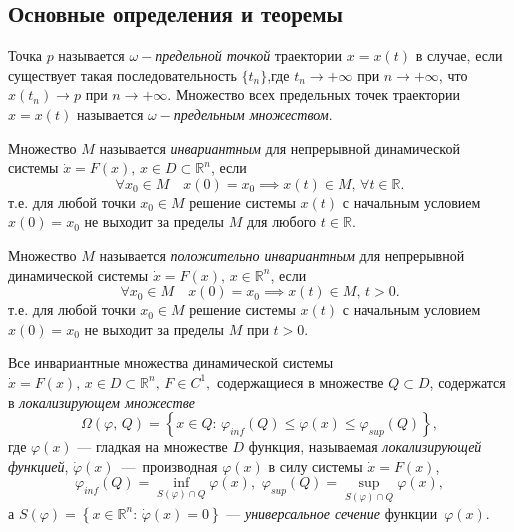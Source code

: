 \documentclass[14pt,a4paper]{extarticle}
\begin{document}
	\subsection{Основные определения и теоремы}
	
	\begin{definition}
		Точка $p$ называется \textit{$\omega-$предельной точкой} траектории \linebreak$x=x(t)$ в случае, если существует такая последовательность $\{t_n\}$,\linebreak где $t_n\rightarrow+\infty$ при $n\rightarrow+\infty$, что $x(t_n)\rightarrow p$ при $n\rightarrow+\infty$. Множество всех предельных точек траектории $x=x(t)$ называется \textit{$\omega-$предельным множеством}.
	\end{definition}
	
	\begin{definition}
		Множество $M$ называется \textit{инвариантным} для непрерывной динамической системы $\dot{x} = F(x),\, x\in D\subset\mathbb{R}^n$, если 
		\[\forall{}x_0\in{}M\quad x(0)=x_0\implies{}x(t)\in{}M,\,\forall{}t\in\mathbb{R}.\]
		т.е. для любой точки $x_0\in M$ решение системы $x(t)$ с начальным условием $x(0)=x_0$ не выходит за пределы $M$ для любого $t\in\mathbb{R}$.
	\end{definition}
	
	\begin{definition}
		Множество $M$ называется \textit{положительно инвариантным} для непрерывной динамической системы $\dot{x} = F(x),\, x\in\mathbb{R}^n$, если 
		\[\forall{}x_0\in{}M\quad x(0)=x_0\implies{}x(t)\in{}M,\, t>0.\]
		т.е. для любой точки $x_0\in M$ решение системы $x(t)$ с начальным условием $x(0)=x_0$ не выходит за пределы $M$ при $t>0$.
	\end{definition}
	
	\begin{theorem}\cite{invar_comp}
		Все инвариантные множества динамической системы \linebreak$\dot{x} = F(x),\, x\in D\subset\mathbb{R}^n,\, F\in C^1,$ содержащиеся в множестве $Q\subset D$, содержатся в \textit{локализирующем множестве}
		\[\Omega(\varphi,\, Q) = \left\{x\in Q:\, \varphi_{inf}(Q)\le \varphi(x) \le \varphi_{sup}(Q)\right\},\]
		где $\varphi(x)$ --- гладкая на множестве $D$ функция, называемая \textit{локализирующей функцией}, $\dot{\varphi}(x)$~---~производная $\varphi(x)$ в силу системы $\dot{x}=F(x)$,
		\[\varphi_{inf}(Q) = \inf\limits_{S(\varphi)\cap Q}\varphi(x),\,\,\varphi_{sup}(Q) = \sup\limits_{S(\varphi)\cap Q}\varphi(x),\]
		а $S(\varphi) = \left\{x\in\mathbb{R}^n:\, \dot{\varphi}(x)=0\right\}$ --- \textit{универсальное сечение} функции~$\varphi(x)$.
	\end{theorem}
	
\end{document}
